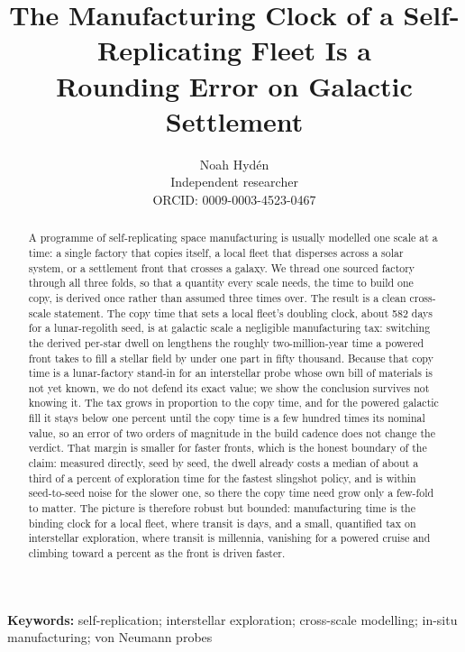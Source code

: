 \documentclass[11pt]{article}
\title{The Manufacturing Clock of a Self-Replicating Fleet Is a\\ Rounding Error on Galactic Settlement}
\author{Noah Hyd\'en\\[2pt]
  \normalsize Independent researcher\\
  \normalsize ORCID: 0009-0003-4523-0467}
\date{}
\begin{document}
\maketitle

\begin{abstract}
A programme of self-replicating space manufacturing is usually modelled one scale at a time: a single factory that copies itself, a local fleet that disperses across a solar system, or a settlement front that crosses a galaxy. We thread one sourced factory through all three folds, so that a quantity every scale needs, the time to build one copy, is derived once rather than assumed three times over. The result is a clean cross-scale statement. The copy time that sets a local fleet's doubling clock, about 582 days for a lunar-regolith seed, is at galactic scale a negligible manufacturing tax: switching the derived per-star dwell on lengthens the roughly two-million-year time a powered front takes to fill a stellar field by under one part in fifty thousand. Because that copy time is a lunar-factory stand-in for an interstellar probe whose own bill of materials is not yet known, we do not defend its exact value; we show the conclusion survives not knowing it. The tax grows in proportion to the copy time, and for the powered galactic fill it stays below one percent until the copy time is a few hundred times its nominal value, so an error of two orders of magnitude in the build cadence does not change the verdict. That margin is smaller for faster fronts, which is the honest boundary of the claim: measured directly, seed by seed, the dwell already costs a median of about a third of a percent of exploration time for the fastest slingshot policy, and is within seed-to-seed noise for the slower one, so there the copy time need grow only a few-fold to matter. The picture is therefore robust but bounded: manufacturing time is the binding clock for a local fleet, where transit is days, and a small, quantified tax on interstellar exploration, where transit is millennia, vanishing for a powered cruise and climbing toward a percent as the front is driven faster.
\end{abstract}

\noindent\textbf{Keywords:} self-replication; interstellar exploration; cross-scale
modelling; in-situ manufacturing; von Neumann probes

\bigskip






\end{document}
